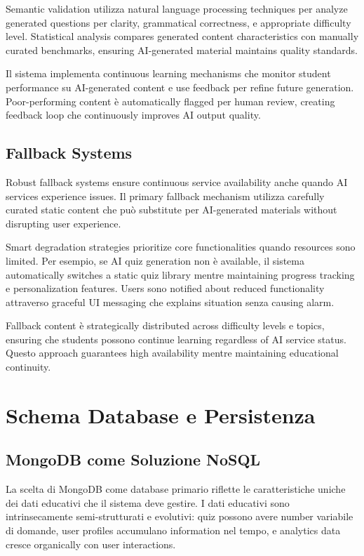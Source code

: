 \documentclass[12pt,a4paper]{article}
\begin{document}
Semantic validation utilizza natural language processing techniques per analyze generated questions per clarity, grammatical correctness, e appropriate difficulty level. Statistical analysis compares generated content characteristics con manually curated benchmarks, ensuring AI-generated material maintains quality standards.

Il sistema implementa continuous learning mechanisms che monitor student performance su AI-generated content e use feedback per refine future generation. Poor-performing content è automatically flagged per human review, creating feedback loop che continuously improves AI output quality.

\subsection{Fallback Systems}

Robust fallback systems ensure continuous service availability anche quando AI services experience issues. Il primary fallback mechanism utilizza carefully curated static content che può substitute per AI-generated materials without disrupting user experience.

Smart degradation strategies prioritize core functionalities quando resources sono limited. Per esempio, se AI quiz generation non è available, il sistema automatically switches a static quiz library mentre maintaining progress tracking e personalization features. Users sono notified about reduced functionality attraverso graceful UI messaging che explains situation senza causing alarm.

Fallback content è strategically distributed across difficulty levels e topics, ensuring che students possono continue learning regardless of AI service status. Questo approach guarantees high availability mentre maintaining educational continuity.

\section{Schema Database e Persistenza}

\subsection{MongoDB come Soluzione NoSQL}

La scelta di MongoDB come database primario riflette le caratteristiche uniche dei dati educativi che il sistema deve gestire. I dati educativi sono intrinsecamente semi-strutturati e evolutivi: quiz possono avere number variabile di domande, user profiles accumulano information nel tempo, e analytics data cresce organically con user interactions.
\end{document}
